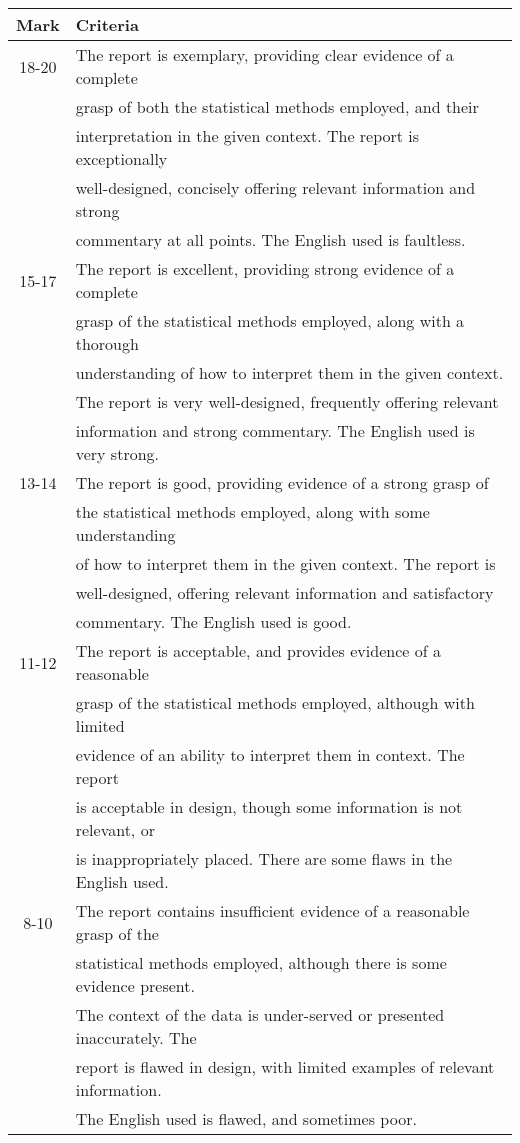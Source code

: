 \documentclass[11pt,a4paper]{article}
\begin{document}
\begin{table}
    \centering

    \begin{tabular}{|c|l|}
    \hline
       \textbf{Mark}  & \textbf{Criteria}\\
       \hline
       18-20  & The report is exemplary, providing clear evidence of a  complete \\ & grasp of both the statistical methods employed, and their \\& interpretation in the given context. The report is exceptionally \\ & well-designed, concisely offering relevant information and strong\\ & commentary at all points. The English used is faultless.\\
       \hline
       15-17  & The report is excellent, providing strong evidence of a complete \\ &grasp of the statistical methods employed, along with a thorough \\ & understanding of how to interpret them in the given context. \\& The report is very well-designed, frequently offering relevant \\ & information and strong commentary. The English used is very strong.
        \\
       \hline
        13-14 & The report is good, providing evidence of a strong grasp  of \\ & the statistical methods employed, along with some understanding \\ & of how to interpret them in the given context. The report is \\ & well-designed,  offering relevant information and satisfactory \\ & commentary. The English used is good. \\
      \hline
        11-12 & The report is acceptable, and provides evidence of a reasonable \\ & grasp of the statistical methods employed, although with limited \\ & evidence of an ability to interpret them in context. The report \\ & is acceptable in design, though some information is not relevant,  or \\ & is inappropriately placed. There are some flaws in the English used. \\
          \hline
       8-10  &  The report contains insufficient evidence of a reasonable grasp of the \\ & statistical methods employed, although there is some evidence present.\\ &  The context of the data is under-served or presented inaccurately. The \\ &report  is flawed in design, with limited examples of relevant information.\\ &  The English used is flawed, and sometimes poor.\\

\end{tabular}
\end{table}
\end{document}
